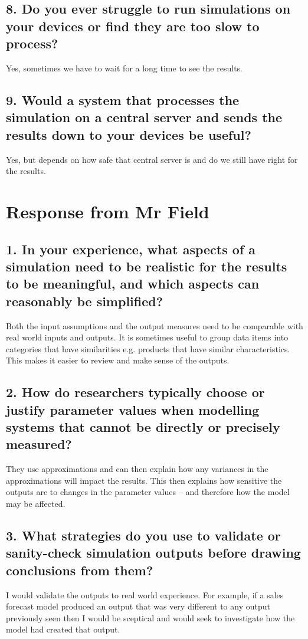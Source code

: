 \subsection*{8. Do you ever struggle to run simulations on your devices or find they are too slow to process?}
Yes, sometimes we have to wait for a long time to see the results.
\subsection*{9. Would a system that processes the simulation on a central server and sends the results down to your devices be useful?}
Yes, but depends on how safe that central server is and do we still have right for the results.

\section{Response from Mr Field}
\label{sec:responseMrField}
\subsection*{1. In your experience, what aspects of a simulation need to be realistic for the results to be meaningful, and which aspects can reasonably be simplified?}
Both the input assumptions and the output measures need to be comparable with real world inputs and outputs. It is sometimes useful to group data items into categories that have similarities e.g. products that have similar characteristics. This makes it easier to review and make sense of the outputs. 
\subsection*{2. How do researchers typically choose or justify parameter values when modelling systems that cannot be directly or precisely measured?}
They use approximations and can then explain how any variances in the approximations will impact the results. This then explains how sensitive the outputs are to changes in the parameter values – and therefore how the model may be affected.
\subsection*{3. What strategies do you use to validate or sanity-check simulation outputs before drawing conclusions from them?}
I would validate the outputs to real world experience. For example, if a sales forecast model produced an output that was very different to any output previously seen then I would be sceptical and would seek to investigate how the model had created that output. 
